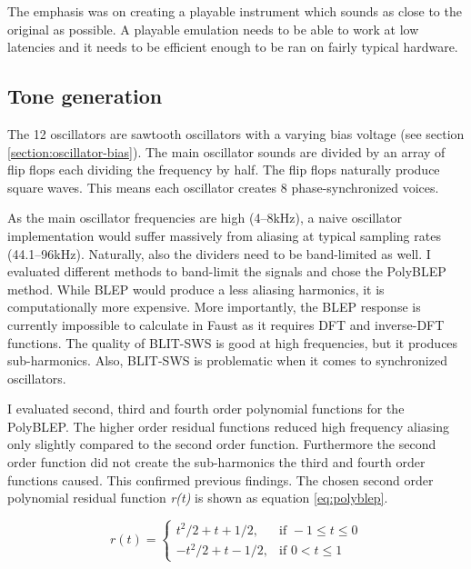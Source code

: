 \documentclass[11pt,a4paper]{article}
\begin{document}
The emphasis was on creating a playable instrument which sounds as close to the original as possible. A playable emulation needs to be able to work at low latencies and it needs to be efficient enough to be ran on fairly typical hardware.

\subsection{Tone generation}
\label{section:tone-generation}

The 12 oscillators are sawtooth oscillators with a varying bias voltage (see section \ref{section:oscillator-bias}). The main oscillator sounds are divided by an array of flip flops each dividing the frequency by half. The flip flops naturally produce square waves. This means each oscillator creates 8 phase-synchronized voices.

As the main oscillator frequencies are high (4--8kHz), a naive oscillator implementation would suffer massively from aliasing at typical sampling rates (44.1--96kHz). Naturally, also the dividers need to be band-limited as well. I evaluated different methods to band-limit the signals and chose the PolyBLEP\cite{antialiasing} method. While BLEP\cite{hardsync} would produce a less aliasing harmonics, it is computationally more expensive. More importantly, the BLEP response is currently impossible to calculate in Faust as it requires DFT and inverse-DFT functions. The quality of BLIT-SWS\cite{blit} is good at high frequencies, but it produces sub-harmonics\cite{antialiasing}. Also, BLIT-SWS is problematic when it comes to synchronized oscillators\cite{hardsync}.

I evaluated second, third and fourth order polynomial functions for the PolyBLEP. The higher order residual functions reduced high frequency aliasing only slightly compared to the second order function. Furthermore the second order function did not create the sub-harmonics the third and fourth order functions caused. This confirmed previous findings\cite{pekonen}. The chosen second order polynomial residual function \emph{r(t)} is shown as equation \ref{eq:polyblep}.

\begin{equation}
\label{eq:polyblep}
r(t) = \begin{cases} 	t^2/2  + t + 1/2, & \mbox{if } -1 \leq t \leq 0\\ 
			-t^2/2 + t - 1/2, & \mbox{if } 0 < t \leq 1 \end{cases}
\end{equation}
\end{document}
